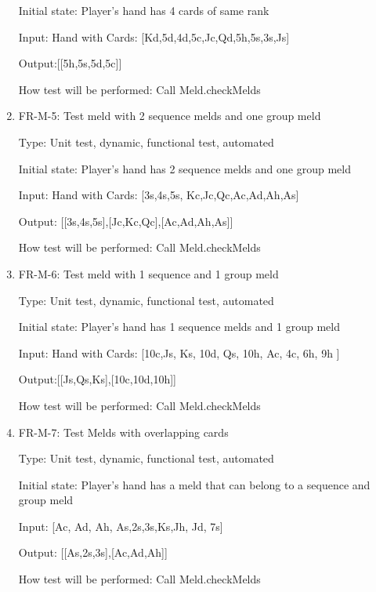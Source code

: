 \documentclass[12pt, titlepage]{article}
\begin{document}
\begin{enumerate}
    Initial state: Player's hand has 4 cards of same rank
    
    Input: Hand with Cards: [Kd,5d,4d,5c,Jc,Qd,5h,5s,3s,Js]
    
    Output:[[5h,5s,5d,5c]]
    
    How test will be performed: Call Meld.checkMelds
    
    \item{FR-M-5: Test meld with 2 sequence melds and one group meld\\}
    
    Type: Unit test, dynamic, functional test, automated
    
    Initial state: Player's hand has 2 sequence melds and one group meld
    
    Input: Hand with Cards: [3s,4s,5s, Kc,Jc,Qc,Ac,Ad,Ah,As]
    
    Output: [[3s,4s,5s],[Jc,Kc,Qc],[Ac,Ad,Ah,As]]
    
    How test will be performed: Call Meld.checkMelds
    
    \item{FR-M-6: Test meld with 1 sequence and 1 group meld\\}
    
    Type: Unit test, dynamic, functional test, automated
    
    Initial state: Player's hand has 1 sequence melds and 1 group meld
    
    Input:  Hand with Cards: [10c,Js, Ks, 10d, Qs, 10h, Ac, 4c, 6h, 9h ]
    
    Output:[[Js,Qs,Ks],[10c,10d,10h]]
    
    How test will be performed: Call Meld.checkMelds
    
    \item{FR-M-7: Test Melds with overlapping cards\\}
    
    Type: Unit test, dynamic, functional test, automated 
    
    Initial state: Player's hand has a meld that can belong to a sequence and group meld
    
    Input: [Ac, Ad, Ah, As,2s,3s,Ks,Jh, Jd, 7s]
    
    Output: [[As,2s,3s],[Ac,Ad,Ah]]
    
    How test will be performed: Call Meld.checkMelds
\end{enumerate}
\end{document}
